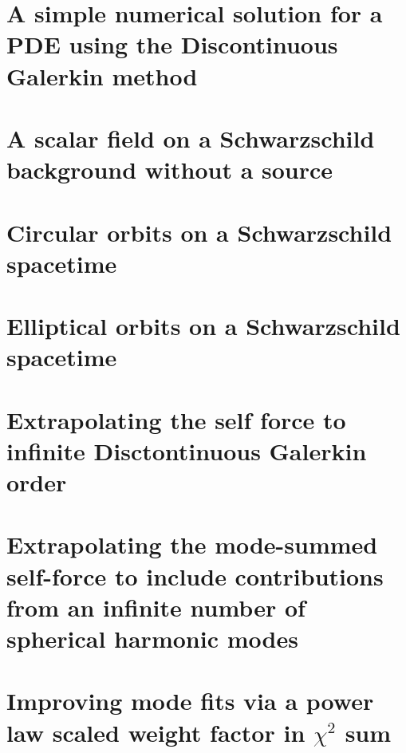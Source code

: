 \documentclass[12pt,letterpaper]{lsuetd}
\begin{document}
\chapter{A simple numerical solution for a PDE using the Discontinuous Galerkin method}
\doublespacing

\pagebreak
\singlespacing
\chapter{A scalar field on a Schwarzschild background without a source}
\doublespacing

\pagebreak
\singlespacing
\chapter{Circular orbits on a Schwarzschild spacetime}
\doublespacing

\label{circularorbit}
\pagebreak
\singlespacing
\chapter{Elliptical orbits on a Schwarzschild spacetime}
\doublespacing

\label{ellipticalorb}
\pagebreak
\singlespacing
\chapter{Extrapolating the self force to infinite Disctontinuous Galerkin order}
\doublespacing

\pagebreak
\singlespacing
\chapter{Extrapolating the mode-summed self-force to include contributions from an infinite number of spherical harmonic modes}
\doublespacing

\pagebreak
\singlespacing
\chapter{Improving mode fits via a power law scaled weight factor in $\chi^2$ sum}
\doublespacing

\label{sigmachap}
\pagebreak
\singlespacing
\end{document}

